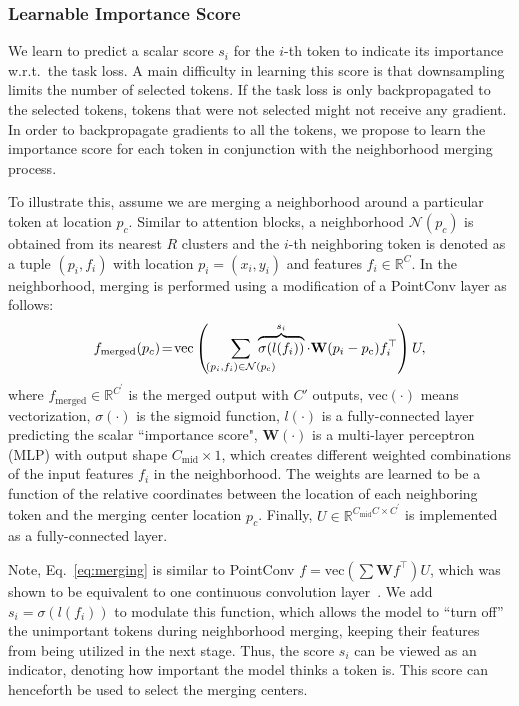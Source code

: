 \documentclass[10pt,twocolumn,letterpaper]{article}
\begin{document}
\subsubsection{Learnable Importance Score}
We learn to predict a scalar score $s_i$ for the $i$-th token to indicate its importance w.r.t.\ the task loss. A main difficulty in learning this score is that downsampling limits the number of selected tokens. If the task loss is only backpropagated to the selected tokens, tokens that were not selected might not receive any gradient. 
In order to backpropagate gradients to all the tokens, we propose to learn the importance score for each token in conjunction with the neighborhood merging process.

To illustrate this, assume we are merging a neighborhood around a particular token at location $p_c$. Similar to attention blocks, a neighborhood $\mathcal{N}(p_c)$ is obtained from its nearest $R$ clusters and the $i$-th neighboring token is denoted as a tuple $(p_i, f_i)$ with location $p_i = (x_i, y_i)$ and features $f_i \in \mathbb{R}^C$. 
In the neighborhood, merging is performed using a modification of a PointConv layer\cite{pointconv} as follows:  \vspace{-0.4cm}
\begin{equation}
    f_{\text{merged}}(p_c) \!=\! \text{vec} \left(\!\sum_{(p_i,f_i)\in \mathcal{N}(p_{\text{c}})} \hspace{-0.5cm}\overbrace{\sigma(l(f_i))}^\text{$s_i$}\cdot \mathbf{W}(p_i-p_{\text{c}})f_i^\top\right)U,
\label{eq:merging}
\end{equation}
where $f_{\text{merged}}\in \mathbb{R}^{C^\prime}$ is the merged output with $C'$ outputs, $\text{vec}(\cdot)$ means vectorization, $\sigma(\cdot)$ is the sigmoid function, $l(\cdot)$ is a fully-connected layer predicting the scalar ``importance score", $\mathbf{W}(\cdot)$ is a multi-layer perceptron (MLP) with output shape $C_{\text{mid}}\times 1$, which creates different weighted combinations of the input features $f_i$ in the neighborhood. The weights are learned to be a function of the relative coordinates between the location of each neighboring token and the merging center location $p_c$. Finally, $U \in \mathbb{R}^{C_{\text{mid}} C \times C^\prime}$ is implemented as a fully-connected layer. 

Note, Eq.~\eqref{eq:merging} is similar to PointConv $f = \mathrm{vec}(\sum \mathbf{W}f^\top) U$, which was shown to be equivalent to one continuous convolution layer~\cite{pointconv}. We add $s_i = \sigma(l(f_i))$ to modulate this function, which allows the model 
to ``turn off'' the unimportant tokens during neighborhood merging, keeping their features from being utilized in the next stage. Thus, the score $s_i$ can be viewed as an indicator, denoting how important the model thinks a token is. This score can henceforth be used to select the merging centers. 
\end{document}
